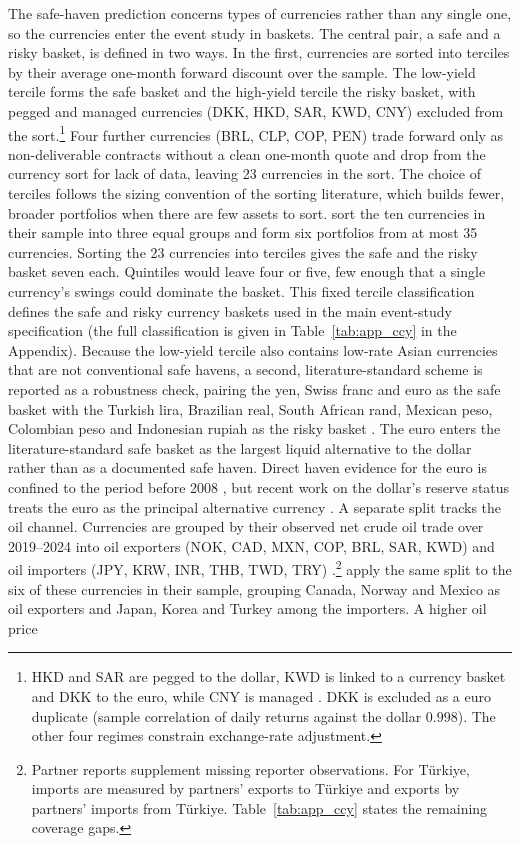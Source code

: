 The safe-haven prediction concerns types of currencies rather than any single one, so the currencies enter the event study in baskets. The central pair, a safe and a risky basket, is defined in two ways. In the first, currencies are sorted into terciles by their average one-month forward discount over the sample. The low-yield tercile forms the safe basket and the high-yield tercile the risky basket, with pegged and managed currencies (DKK, HKD, SAR, KWD, CNY) excluded from the sort.\footnote{HKD and SAR are pegged to the dollar, KWD is linked to a currency basket and DKK to the euro, while CNY is managed \parencite{imf_2025_exchange_arrangements}. DKK is excluded as a euro duplicate (sample correlation of daily returns against the dollar $0.998$). The other four regimes constrain exchange-rate adjustment.} Four further currencies (BRL, CLP, COP, PEN) trade forward only as non-deliverable contracts without a clean one-month quote and drop from the currency sort for lack of data, leaving 23 currencies in the sort. The choice of terciles follows the sizing convention of the sorting literature, which builds fewer, broader portfolios when there are few assets to sort. \textcite{asness_moskowitz_pedersen_2013} sort the ten currencies in their sample into three equal groups and \textcite{lustig_roussanov_verdelhan_2011} form six portfolios from at most 35 currencies. Sorting the 23 currencies into terciles gives the safe and the risky basket seven each. Quintiles would leave four or five, few enough that a single currency's swings could dominate the basket. This fixed tercile classification defines the safe and risky currency baskets used in the main event-study specification (the full classification is given in Table~\ref{tab:app_ccy} in the Appendix). Because the low-yield tercile also contains low-rate Asian currencies that are not conventional safe havens, a second, literature-standard scheme is reported as a robustness check, pairing the yen, Swiss franc and euro as the safe basket \parencite{ranaldo_soderlind_2010} with the Turkish lira, Brazilian real, South African rand, Mexican peso, Colombian peso and Indonesian rupiah as the risky basket \parencite{debock_decarvalhofilho_2015}. The euro enters the literature-standard safe basket as the largest liquid alternative to the dollar rather than as a documented safe haven. Direct haven evidence for the euro is confined to the period before 2008 \parencite{habib_stracca_2012}, but recent work on the dollar's reserve status treats the euro as the principal alternative currency \parencite{jiang_krishnamurthy_lustig_richmond_2026}. A separate split tracks the oil channel. Currencies are grouped by their observed net crude oil trade over 2019--2024 into oil exporters (NOK, CAD, MXN, COP, BRL, SAR, KWD) and oil importers (JPY, KRW, INR, THB, TWD, TRY) \parencite{ds_un_comtrade}.\footnote{Partner reports supplement missing reporter observations. For Türkiye, imports are measured by partners' exports to Türkiye and exports by partners' imports from Türkiye. Table~\ref{tab:app_ccy} states the remaining coverage gaps.} \textcite{chen_liu_wang_zhu_2016} apply the same split to the six of these currencies in their sample, grouping Canada, Norway and Mexico as oil exporters and Japan, Korea and Turkey among the importers. A higher oil price 